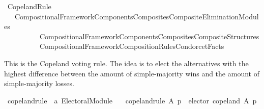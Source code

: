 %
\begin{isabellebody}%
%
%
\isadelimdocument
\isanewline
%
\endisadelimdocument
%
\isatagdocument
\isanewline
%
\isamarkuptrue%
%
\endisatagdocument
{\isafolddocument}%
%
\isadelimdocument
%
\endisadelimdocument
%
\isadelimtheory
%
\endisadelimtheory
%
\isatagtheory
{}\isamarkupfalse%
\ Copeland{\isacharunderscore}{\kern0pt}Rule\isanewline
\ \ \ {\isachardoublequoteopen}{\isachardot}{\kern0pt}{\isachardot}{\kern0pt}{\isacharslash}{\kern0pt}Compositional{\isacharunderscore}{\kern0pt}Framework{\isacharslash}{\kern0pt}Components{\isacharslash}{\kern0pt}Composites{\isacharslash}{\kern0pt}Composite{\isacharunderscore}{\kern0pt}Elimination{\isacharunderscore}{\kern0pt}Modules{\isachardoublequoteclose}\isanewline
\ \ \ \ \ \ \ \ \ \ {\isachardoublequoteopen}{\isachardot}{\kern0pt}{\isachardot}{\kern0pt}{\isacharslash}{\kern0pt}Compositional{\isacharunderscore}{\kern0pt}Framework{\isacharslash}{\kern0pt}Components{\isacharslash}{\kern0pt}Composites{\isacharslash}{\kern0pt}Composite{\isacharunderscore}{\kern0pt}Structures{\isachardoublequoteclose}\isanewline
\ \ \ \ \ \ \ \ \ \ {\isachardoublequoteopen}{\isachardot}{\kern0pt}{\isachardot}{\kern0pt}{\isacharslash}{\kern0pt}Compositional{\isacharunderscore}{\kern0pt}Framework{\isacharslash}{\kern0pt}Composition{\isacharunderscore}{\kern0pt}Rules{\isacharslash}{\kern0pt}Condorcet{\isacharunderscore}{\kern0pt}Facts{\isachardoublequoteclose}\isanewline
\isanewline
{}%
\endisatagtheory
{\isafoldtheory}%
%
\isadelimtheory
%
\endisadelimtheory
%
\begin{isamarkuptext}%
This is the Copeland voting rule. The idea is to elect the alternatives with
the highest difference between the amount of simple-majority wins and the
amount of simple-majority losses.%
\end{isamarkuptext}\isamarkuptrue%
%
\isadelimdocument
%
\endisadelimdocument
%
\isatagdocument
%
\isamarkuptrue%
%
\endisatagdocument
{\isafolddocument}%
%
\isadelimdocument
%
\endisadelimdocument
{}\isamarkupfalse%
\ copeland{\isacharunderscore}{\kern0pt}rule\ {\isacharcolon}{\kern0pt}{\isacharcolon}{\kern0pt}\ {\isachardoublequoteopen}{\isacharprime}{\kern0pt}a\ Electoral{\isacharunderscore}{\kern0pt}Module{\isachardoublequoteclose}\ \isanewline
\ \ {\isachardoublequoteopen}copeland{\isacharunderscore}{\kern0pt}rule\ A\ p\ {\isacharequal}{\kern0pt}\ elector\ copeland\ A\ p{\isachardoublequoteclose}\isanewline

\end{isabellebody}
